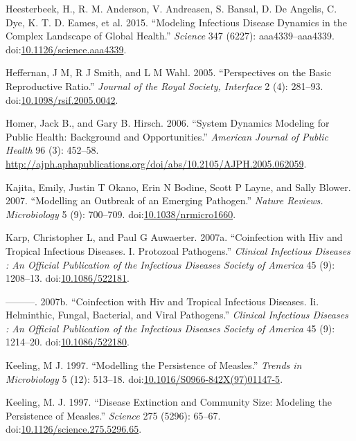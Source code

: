 \documentclass[]{article}
\theoremstyle{definition}
\theoremstyle{definition}
\theoremstyle{definition}
\theoremstyle{remark}
\begin{document}
\hypertarget{ref-heesterbeek15}{}
Heesterbeek, H., R. M. Anderson, V. Andreasen, S. Bansal, D. De Angelis,
C. Dye, K. T. D. Eames, et al. 2015. ``Modeling Infectious Disease
Dynamics in the Complex Landscape of Global Health.'' \emph{Science} 347
(6227): aaa4339--aaa4339.
doi:\href{https://doi.org/10.1126/science.aaa4339}{10.1126/science.aaa4339}.

\hypertarget{ref-heffernan05}{}
Heffernan, J M, R J Smith, and L M Wahl. 2005. ``Perspectives on the
Basic Reproductive Ratio.'' \emph{Journal of the Royal Society,
Interface} 2 (4): 281--93.
doi:\href{https://doi.org/10.1098/rsif.2005.0042}{10.1098/rsif.2005.0042}.

\hypertarget{ref-homer06}{}
Homer, Jack B., and Gary B. Hirsch. 2006. ``System Dynamics Modeling for
Public Health: Background and Opportunities.'' \emph{American Journal of
Public Health} 96 (3): 452--58.
\url{http://ajph.aphapublications.org/doi/abs/10.2105/AJPH.2005.062059}.

\hypertarget{ref-kajita07}{}
Kajita, Emily, Justin T Okano, Erin N Bodine, Scott P Layne, and Sally
Blower. 2007. ``Modelling an Outbreak of an Emerging Pathogen.''
\emph{Nature Reviews. Microbiology} 5 (9): 700--709.
doi:\href{https://doi.org/10.1038/nrmicro1660}{10.1038/nrmicro1660}.

\hypertarget{ref-karp07a}{}
Karp, Christopher L, and Paul G Auwaerter. 2007a. ``Coinfection with Hiv
and Tropical Infectious Diseases. I. Protozoal Pathogens.''
\emph{Clinical Infectious Diseases : An Official Publication of the
Infectious Diseases Society of America} 45 (9): 1208--13.
doi:\href{https://doi.org/10.1086/522181}{10.1086/522181}.

\hypertarget{ref-karp07}{}
---------. 2007b. ``Coinfection with Hiv and Tropical Infectious
Diseases. Ii. Helminthic, Fungal, Bacterial, and Viral Pathogens.''
\emph{Clinical Infectious Diseases : An Official Publication of the
Infectious Diseases Society of America} 45 (9): 1214--20.
doi:\href{https://doi.org/10.1086/522180}{10.1086/522180}.

\hypertarget{ref-keeling97}{}
Keeling, M J. 1997. ``Modelling the Persistence of Measles.''
\emph{Trends in Microbiology} 5 (12): 513--18.
doi:\href{https://doi.org/10.1016/S0966-842X(97)01147-5}{10.1016/S0966-842X(97)01147-5}.

\hypertarget{ref-keeling97a}{}
Keeling, M. J. 1997. ``Disease Extinction and Community Size: Modeling
the Persistence of Measles.'' \emph{Science} 275 (5296): 65--67.
doi:\href{https://doi.org/10.1126/science.275.5296.65}{10.1126/science.275.5296.65}.
\end{document}
